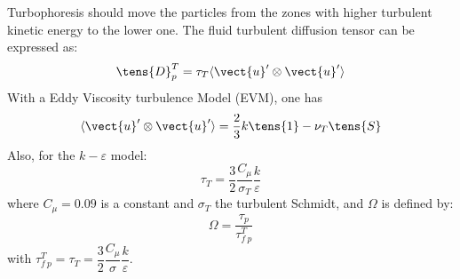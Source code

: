 Turbophoresis should move the particles from the zones with higher turbulent kinetic
energy to the lower one.
The fluid turbulent diffusion tensor can be expressed as:
\begin{equation}
  \tens{{D}}^T_p=\tau_T{{\langle \vect{u}^\prime \otimes \vect{u}^\prime\rangle}}
\end{equation}
With a Eddy Viscosity turbulence Model (EVM), one has
\begin{equation}
  {{\langle \vect{u}^\prime \otimes \vect{u}^\prime\rangle}}=\dfrac{2}{3}k\tens{{1}}-\nu_T \tens{{S}}
\end{equation}
Also, for the $k-\varepsilon$ model:
\begin{equation}
  \tau_T=\dfrac{3}{2}\dfrac{C_\mu}{\sigma_T}\dfrac{k}{\varepsilon}
\end{equation}
where $C_\mu=0.09$ is a constant and $\sigma_T$ the turbulent Schmidt, and $\Omega$ is defined by:
\begin{equation}
  \Omega=\dfrac{\tau_p}{\tau_{f\ p}^T}
\end{equation}
with $\tau_{f\ p}^T=\tau_T=\dfrac{3}{2} \dfrac{C_\mu}{\sigma} \dfrac{k}{\varepsilon}$.


